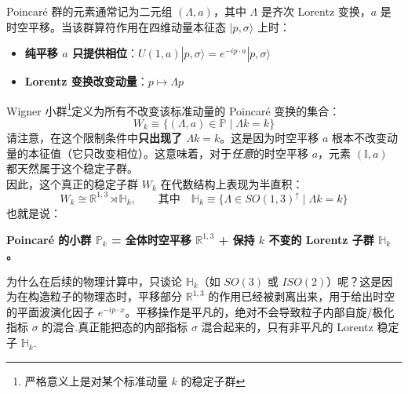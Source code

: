 Poincaré 群的元素通常记为二元组 $(\Lambda, a)$，其中 $\Lambda$ 是齐次 Lorentz 变换，$a$ 是时空平移。当该群算符作用在四维动量本征态 $|p, \sigma\rangle$ 上时：
\begin{itemize}
    \item \textbf{纯平移 $a$ 只提供相位}：$U(1, a)|p, \sigma\rangle = e^{-ip \cdot a}|p, \sigma\rangle$
    \item \textbf{Lorentz 变换改变动量}：$p \mapsto \Lambda p$
\end{itemize}
\vspace{2ex}
Wigner 小群\footnote{严格意义上是对某个标准动量 $k$ 的稳定子群}定义为所有不改变该标准动量的 Poincaré 变换的集合：
\begin{equation}
    \boxed{W_k \equiv \{(\Lambda, a) \in \mathbb{P} \mid \Lambda k = k\}}
\end{equation}
请注意，在这个限制条件中\textbf{只出现了 $\Lambda k = k$}。这是因为时空平移 $a$ 根本不改变动量的本征值（它只改变相位）。这意味着，对于\emph{任意}的时空平移 $a$，元素 $(\mathbb{I}, a)$ 都天然属于这个稳定子群。
\vspace{2ex}
\\
因此，这个真正的稳定子群 $W_k$ 在代数结构上表现为半直积：
\begin{equation}\label{total_lorentz_group}
    \boxed{W_k \cong \mathbb{R}^{1,3} \rtimes \mathbb{H}_k, \qquad \text{其中} \quad \mathbb{H}_k \equiv \{\Lambda \in SO(1,3)^\uparrow \mid \Lambda k = k\}}
\end{equation}
也就是说：
\begin{tcolorbox}[colback=white!5,colframe=black!45]
    \begin{center}
    \textbf{Poincaré 的小群 $\mathbb{P}_k$ = 全体时空平移 $\mathbb{R}^{1,3}$ + 保持 $k$ 不变的 Lorentz 子群 $\mathbb{H}_k$。}
\end{center}
\end{tcolorbox}
\vspace{2ex}
为什么在后续的物理计算中，只谈论 $\mathbb{H}_k$（如 $SO(3)$ 或 $ISO(2)$）呢？这是因为在构造粒子的物理态时，平移部分 $\mathbb{R}^{1,3}$ 的作用已经被剥离出来，用于给出时空的平面波演化因子 $e^{-ip\cdot x}$。平移操作是平凡的，绝对不会导致粒子内部自旋/极化指标 $\sigma$ 的混合.真正能把态的内部指标 $\sigma$ 混合起来的，只有非平凡的 Lorentz 稳定子 $\mathbb{H}_k$.



\newpage
